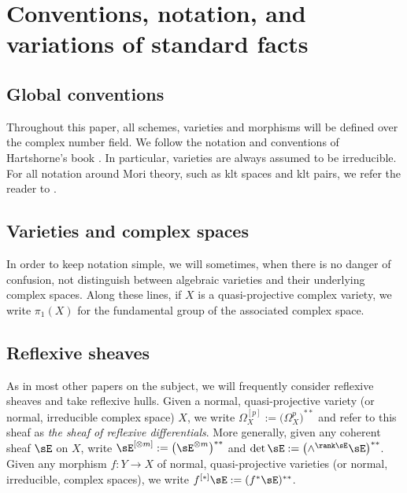 \section{Conventions, notation, and variations of standard facts}

\subsection{Global conventions}

Throughout this paper, all schemes, varieties and morphisms will be defined over
the complex number field. We follow the notation and conventions of
Hartshorne's book \cite{Ha77}. In particular, varieties are always assumed to
be irreducible. For all notation around Mori theory, such as klt spaces and klt
pairs, we refer the reader to \cite{KM98}.

\subsection{Varieties and complex spaces}

In order to keep notation simple, we will sometimes, when there is no danger of
confusion, not distinguish between algebraic varieties and their underlying
complex spaces. Along these lines, if $X$ is a quasi-projective complex
variety, we write $\pi_1(X)$ for the fundamental group of the associated complex
space.

\subsection{Reflexive sheaves}

As in most other papers on the subject, we will frequently consider reflexive
sheaves and take reflexive hulls. Given a normal, quasi-projective variety (or
normal, irreducible complex space) $X$, we write
$\Omega^{[p]}_X := \bigl(\Omega^p_X \bigr)^{**}$ and refer to this sheaf as \emph{the
sheaf of reflexive differentials}. More generally, given any coherent sheaf
$\sE$ on $X$, write $\sE^{[\otimes m]} := \bigl(\sE^{\otimes m} \bigr)^{**}$ and
$\det \sE := \bigl(\wedge^{\rank \sE} \sE \bigr)^{**}$. Given any morphism $f : Y \to X$ of
normal, quasi-projective varieties (or normal, irreducible, complex spaces), we
write $f^{[*]} \sE := (f^* \sE)^{**}$.

